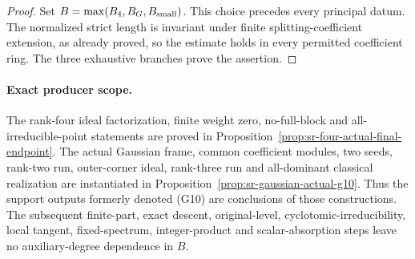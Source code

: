 \begin{proof}
Set \(B=\max(B_4,B_G,B_{\rm small})\).
This choice precedes every principal datum.
The normalized strict length is invariant under finite
splitting-coefficient extension, as already proved,
so the estimate holds in every permitted coefficient ring.
The three exhaustive branches prove the assertion.
\end{proof}

\paragraph{Exact producer scope.}
The rank-four ideal factorization, finite weight zero,
no-full-block and all-irreducible-point statements are
proved in Proposition~\ref{prop:sr-four-actual-final-endpoint}.
The actual Gaussian frame, common coefficient modules,
two seeds, rank-two run, outer-corner ideal, rank-three
run and all-dominant classical realization are instantiated
in Proposition~\ref{prop:sr-gaussian-actual-g10}.
Thus the support outputs formerly denoted (G10) are
conclusions of those constructions.
The subsequent finite-part, exact descent, original-level,
cyclotomic-irreducibility, local tangent, fixed-spectrum,
integer-product and scalar-absorption steps leave no
auxiliary-degree dependence in \(B\).
